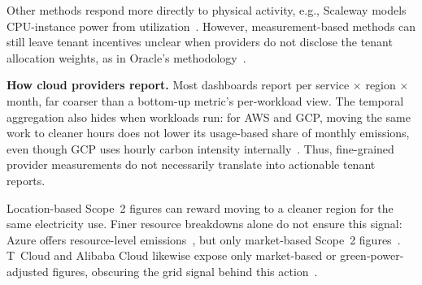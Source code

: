 \documentclass[sigconf]{acmart}
\newcommand{\parag}[1]{\vspace{2mm}\noindent\textbf{#1.}\hspace{2mm}}
\begin{document}
Other methods respond more directly to physical activity, e.g., Scaleway models CPU-instance power from utilization~\cite{scaleway-instances-footprint}.
However, measurement-based methods can still leave tenant incentives unclear when providers do not disclose the tenant allocation weights, as in Oracle's methodology~\cite{oracle-emissions-management}.

\parag{How cloud providers report}
Most dashboards report per service $\times$ region $\times$ month, far coarser than a bottom-up metric's per-workload view.
The temporal aggregation also hides when workloads run: for AWS and GCP, moving the same work to cleaner hours does not lower its usage-based share of monthly emissions, even though GCP uses hourly carbon intensity internally~\cite{aws-ccft-model3,schneider-mattia-2024}.
Thus, fine-grained provider measurements do not necessarily translate into actionable tenant reports.

Location-based Scope~2 figures can reward moving to a cleaner region for the same electricity use.
Finer resource breakdowns alone do not ensure this signal: Azure offers resource-level emissions~\cite{azure-carbon-overview}, but only market-based Scope~2 figures~\cite{azure-carbon-data}.
T~Cloud and Alibaba Cloud likewise expose only market-based or green-power-adjusted figures, obscuring the grid signal behind this action~\cite{tcloud-sustainability-dashboard,alibaba-cloud-carbon-footprint}.
\end{document}
